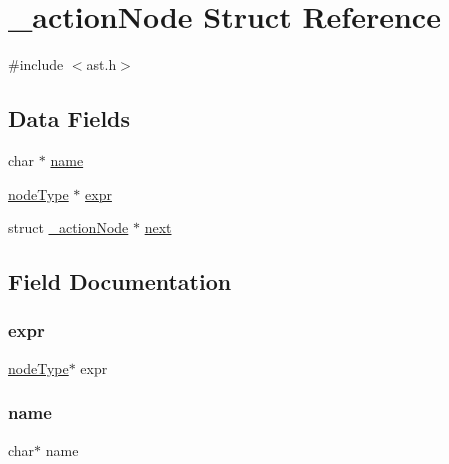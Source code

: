 \hypertarget{struct__action_node}{}\section{\+\_\+action\+Node Struct Reference}
\label{struct__action_node}


{\ttfamily \#include $<$ast.\+h$>$}

\subsection*{Data Fields}
\begin{DoxyCompactItemize}
\item 
char $\ast$ \hyperlink{struct__action_node_a5ac083a645d964373f022d03df4849c8}{name}
\item 
\hyperlink{ast_8h_a5107519e23f35648044d9a2300d4a609}{node\+Type} $\ast$ \hyperlink{struct__action_node_a0cb5bf33af234a2e855d48d585bd0fd5}{expr}
\item 
struct \hyperlink{struct__action_node}{\+\_\+action\+Node} $\ast$ \hyperlink{struct__action_node_a99f2a1b315217397adbc19ed2501d4d0}{next}
\end{DoxyCompactItemize}


\subsection{Field Documentation}
\mbox{\label{struct__action_node_a0cb5bf33af234a2e855d48d585bd0fd5}} 
\subsubsection{\texorpdfstring{expr}{expr}}
{\footnotesize\ttfamily \hyperlink{ast_8h_a5107519e23f35648044d9a2300d4a609}{node\+Type}$\ast$ expr}

\mbox{\label{struct__action_node_a5ac083a645d964373f022d03df4849c8}} 
\subsubsection{\texorpdfstring{name}{name}}
{\footnotesize\ttfamily char$\ast$ name}

